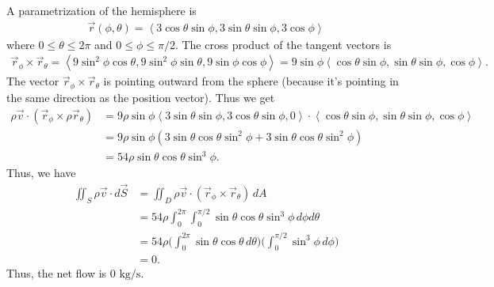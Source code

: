 	A parametrization of the hemisphere is
		\begin{align*}
		\vec{r} (\phi , \theta ) = \left\langle 3 \cos \theta \sin \phi , 3 \sin \theta \sin \phi , 3 \cos \phi \right\rangle 
		\end{align*}
	where $0 \leq \theta \leq 2\pi$ and $0\leq \phi \leq \pi/2$. The cross product of the tangent vectors is
		\begin{align*}
		\vec{r}_\phi \times \vec{r}_\theta = \left\langle 9 \sin^2 \phi \cos \theta , 9 \sin^2 \phi \sin \theta , 9 \sin \phi \cos \phi \right\rangle = 9 \sin \phi \left\langle \cos \theta \sin \phi , \sin \theta \sin \phi , \cos \phi \right\rangle .
		\end{align*}
	 The vector $\vec{r}_\phi \times \vec{r}_\theta$ is pointing outward from the sphere (because it's pointing in the same direction as the position vector). Thus we get
	 	\begin{align*}
	 	\rho \vec{v} \cdot (\vec{r}_\phi \times \rho \vec{r}_\theta) &= 9 \rho \sin \phi \left\langle 3 \sin \theta \sin \phi , 3 \cos \theta \sin \phi , 0 \right\rangle \cdot \left\langle \cos \theta \sin \phi , \sin \theta \sin \phi , \cos \phi \right\rangle \\
	 	&= 9 \rho \sin \phi (3 \sin \theta \cos \theta \sin^2\phi + 3 \sin \theta \cos \theta \sin^2 \phi ) \\
	 	&= 54 \rho \sin \theta \cos \theta \sin^3 \phi .
	 	\end{align*}
	 Thus, we have
		\begin{align*}
		\iint_S \rho \vec{v} \cdot d \vec{S} &= \iint_D \rho \vec{v} \cdot (\vec{r}_\phi \times \vec{r}_\theta ) \, dA \\
		&= 54\rho \int_0^{2\pi} \int_0^{\pi/2} \sin \theta \cos \theta \sin^3 \phi \, d\phi d \theta \\
		&= 54 \rho \Big( \int_0^{2\pi} \sin \theta \cos \theta \, d\theta \Big) \Big( \int_0^{\pi/2} \sin^3 \phi \, d\phi \Big) \\
		&= 0 .
		\end{align*}
	Thus, the net flow is $0 \text{ kg/s}$.
	
